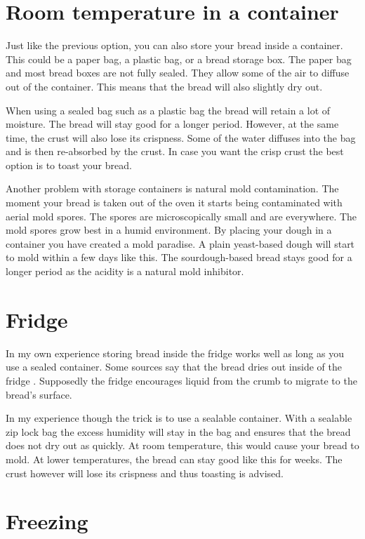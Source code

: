 \section{Room temperature in a container}

Just like the previous option, you can also store your
bread inside a container. This could be a paper bag, 
a plastic bag, or a bread storage box. The paper bag and
most bread boxes are not fully sealed. They allow some of
the air to diffuse out of the container. This means that
the bread will also slightly dry out.

When using a sealed bag such as a plastic bag the bread
will retain a lot of moisture. The bread will stay good
for a longer period. However, at the same time, the crust
will also lose its crispness. Some of the water diffuses
into the bag and is then re-absorbed by the crust. In case
you want the crisp crust the best option is to toast your
bread.

Another problem with storage containers is natural
mold contamination. The moment your bread is taken out of
the oven it starts being contaminated with aerial mold spores.
The spores are microscopically small and are everywhere.
The mold spores grow best in a humid environment. By placing
your dough in a container you have created a mold paradise.
A plain yeast-based dough will start to mold within a few days
like this. The sourdough-based bread stays good
for a longer period as the acidity is a natural mold
inhibitor.

\section{Fridge}

In my own experience storing bread inside the fridge
works well as long as you use a sealed container. Some
sources say that the bread dries out inside of the
fridge \cite{storing+bread}. Supposedly the fridge
encourages liquid from the crumb to migrate to the bread's surface.

In my experience though the trick is to use a sealable
container. With a sealable zip lock bag
the excess humidity will stay in the bag and ensures
that the bread does not dry out as quickly. At room
temperature, this would cause your bread to mold. At
lower temperatures, the bread can stay good like this for
weeks. The crust however will lose its crispness and
thus toasting is advised.

\section{Freezing}

